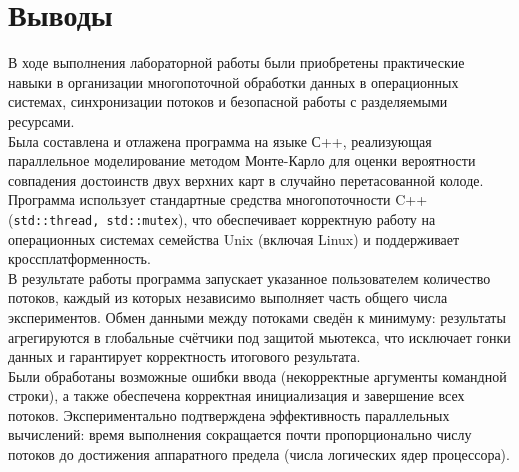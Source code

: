 \section{Выводы}
В ходе выполнения лабораторной работы были приобретены практические навыки в организации многопоточной обработки данных в операционных системах, синхронизации потоков и безопасной работы с разделяемыми ресурсами.\\
Была составлена и отлажена программа на языке С++, реализующая параллельное моделирование методом Монте-Карло для оценки вероятности совпадения достоинств двух верхних карт в случайно перетасованной колоде. Программа использует стандартные средства многопоточности C++ (\texttt{std::thread, std::mutex}), что обеспечивает корректную работу на операционных системах семейства Unix (включая Linux) и поддерживает кроссплатформенность.\\
В результате работы программа запускает указанное пользователем количество потоков, каждый из которых независимо выполняет часть общего числа экспериментов. Обмен данными между потоками сведён к минимуму: результаты агрегируются в глобальные счётчики под защитой мьютекса, что исключает гонки данных и гарантирует корректность итогового результата.\\
Были обработаны возможные ошибки ввода (некорректные аргументы командной строки), а также обеспечена корректная инициализация и завершение всех потоков. Экспериментально подтверждена эффективность параллельных вычислений: время выполнения сокращается почти пропорционально числу потоков до достижения аппаратного предела (числа логических ядер процессора).
\pagebreak